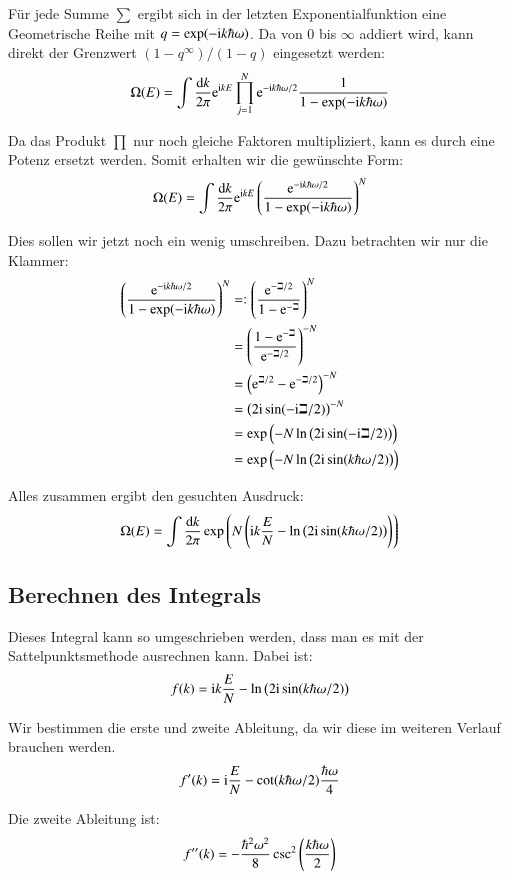 Für jede Summe $\sum$ ergibt sich in der letzten Exponentialfunktion eine Geometrische Reihe mit $q = \exp( - \mathrm i k \hbar\omega)$. Da von 0 bis $\infty$ addiert wird, kann direkt der Grenzwert $(1 - q^\infty)/(1-q)$ eingesetzt werden:
\[
    \Omega(E) =
    \int \frac{\dif k}{2 \pi}
    \eup^{\iup k E}
    \prod_{j=1}^N
    \eup^{-\iup k \hbar\omega /2}
    \frac1{1 - \exp( - \iup k \hbar\omega)}
\]

Da das Produkt $\prod$ nur noch gleiche Faktoren multipliziert, kann es durch
eine Potenz ersetzt werden. Somit erhalten wir die gewünschte Form:
\[
    \Omega(E) =
    \int \frac{\dif k}{2 \pi}
    \eup^{\iup k E}
    \del{ \frac{\eup^{-\iup k \hbar\omega /2}}{1 - \exp( - \iup k \hbar\omega)} }^N
\]

Dies sollen wir jetzt noch ein wenig umschreiben. Dazu betrachten wir nur die Klammer:
\begin{align*}
    \del{ \frac{\eup^{-\iup k \hbar\omega /2}}{1 - \exp( - \iup k \hbar\omega)} }^N
    &=: \del{\frac{\eup^{-\beth/2}}{1 - \eup^{-\beth}}}^N \\
    &= \del{\frac{1 - \eup^{-\beth}}{\eup^{-\beth/2}}}^{-N} \\
    &= \del{\eup^{\beth/2} - \eup^{-\beth/2}}^{-N} \\
    &= \del{2\iup \sin(-\iup \beth/2)}^{-N} \\
    &= \exp\del{-N \ln\del{2\iup \sin(-\iup \beth/2)}} \\
    &= \exp\del{-N \ln\del{2\iup \sin(k \hbar\omega/2)}}
\end{align*}

Alles zusammen ergibt den gesuchten Ausdruck:
\[
    \Omega(E) =
    \int \frac{\dif k}{2 \pi}
    \exp\del{N \del{ \iup k \frac EN - \ln\del{2\iup \sin(k \hbar\omega/2)} }}
\]

\subsection{Berechnen des Integrals}

Dieses Integral kann so umgeschrieben werden, dass man es mit der Sattelpunktsmethode ausrechnen kann. Dabei ist:
\[
    f(k) = \iup k \frac EN - \ln\del{2\iup \sin(k \hbar\omega/2)}
\]

Wir bestimmen die erste und zweite Ableitung, da wir diese im weiteren Verlauf brauchen werden.
\[
    f'(k) = \mathrm i \frac EN - \cot(k \hbar\omega/2) \frac{\hbar\omega}{4}
\]

Die zweite Ableitung ist:
\[
    f''(k) = - \frac{\hbar^2 \omega^2}8 \csc^2\del{\frac{k \hbar\omega}2}
\]

